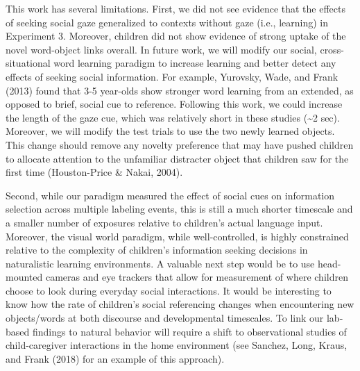\documentclass[man,floatsintext]{apa6}
\begin{document}
This work has several limitations. First, we did not see evidence that
the effects of seeking social gaze generalized to contexts without gaze
(i.e., learning) in Experiment 3. Moreover, children did not show
evidence of strong uptake of the novel word-object links overall. In
future work, we will modify our social, cross-situational word learning
paradigm to increase learning and better detect any effects of seeking
social information. For example, Yurovsky, Wade, and Frank (2013) found
that 3-5 year-olds show stronger word learning from an extended, as
opposed to brief, social cue to reference. Following this work, we could
increase the length of the gaze cue, which was relatively short in these
studies (\textasciitilde{}2 sec). Moreover, we will modify the test
trials to use the two newly learned objects. This change should remove
any novelty preference that may have pushed children to allocate
attention to the unfamiliar distracter object that children saw for the
first time (Houston-Price \& Nakai, 2004).

Second, while our paradigm measured the effect of social cues on
information selection across multiple labeling events, this is still a
much shorter timescale and a smaller number of exposures relative to
children's actual language input. Moreover, the visual world paradigm,
while well-controlled, is highly constrained relative to the complexity
of children's information seeking decisions in naturalistic learning
environments. A valuable next step would be to use head-mounted cameras
and eye trackers that allow for measurement of where children choose to
look during everyday social interactions. It would be interesting to
know how the rate of children's social referencing changes when
encountering new objects/words at both discourse and developmental
timescales. To link our lab-based findings to natural behavior will
require a shift to observational studies of child-caregiver interactions
in the home environment (see Sanchez, Long, Kraus, and Frank (2018) for
an example of this approach).
\end{document}
